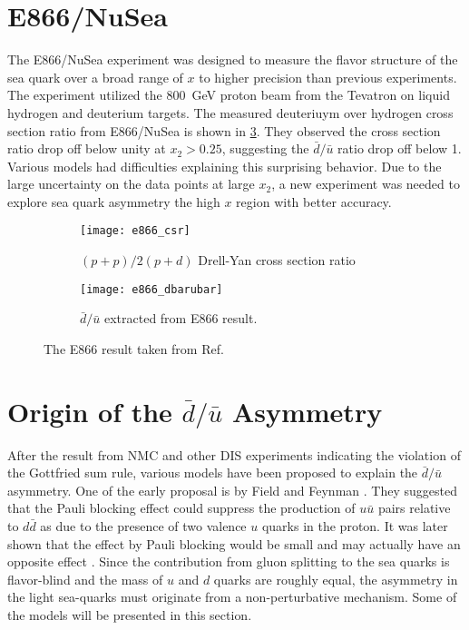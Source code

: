 \documentclass[../main.tex]{subfiles}
\begin{document}
\section{E866/NuSea}
\label{sec:E866}
The E866/NuSea experiment \cite{towell2001} was designed to measure the flavor structure of the sea
quark over a broad range of $x$ to higher precision than previous experiments. The
experiment utilized the \SI{800}{\GeV} proton beam from the Tevatron on liquid
hydrogen and deuterium targets. The measured deuteriuym over hydrogen cross section
ratio from E866/NuSea is shown in \cref{fig:e866_result}. They observed the
cross section ratio drop off below unity at $x_2>0.25$, suggesting the $\bar{d}/\bar{u}$
ratio drop off below 1. Various models had difficulties explaining this surprising
behavior. Due to the large uncertainty on the data points at large $x_2$, a new
experiment was needed to explore sea quark asymmetry the high $x$ region with better
accuracy.
\begin{figure}[htbp!]
	\centering
	\begin{subfigure}{0.45\linewidth}
		\texttt{[image: e866\_csr]}
		\caption{$(p+p)/2(p+d)$ Drell-Yan cross section ratio}
		\label{subfig:e866_csr}
	\end{subfigure}
	\begin{subfigure}{0.45\linewidth}
		\texttt{[image: e866\_dbarubar]}
		\caption{$\bar{d}/\bar{u}$ extracted from E866 result.}
		\label{subfig:e866_dbarubar}
	\end{subfigure}
	\caption{The E866 result taken from Ref.~\cite{towell2001}}
	\label{fig:e866_result}
\end{figure}



\section{Origin of the \texorpdfstring{$\bar{d}/\bar{u}$}{dbar/ubar} Asymmetry }
After the result from NMC and other DIS experiments indicating the violation of the Gottfried sum rule,
various models have been proposed to explain the $\bar{d}/\bar{u}$ asymmetry. One of the early proposal
is by Field and Feynman \cite{field1977}. They suggested that the Pauli blocking effect
could suppress the production of $u\bar{u}$ pairs relative to  $d\bar{d}$ as due to the presence of two
valence $u$ quarks in the proton. It was later shown that the effect by Pauli blocking would be small and
may actually have an opposite effect \cite{steffens1997}. Since the contribution from gluon splitting to the
sea quarks is flavor-blind and the mass of $u$ and $d$ quarks are roughly equal, the asymmetry in the
light sea-quarks must originate from a non-perturbative mechanism. Some of the models will be presented
in this section.
\end{document}
